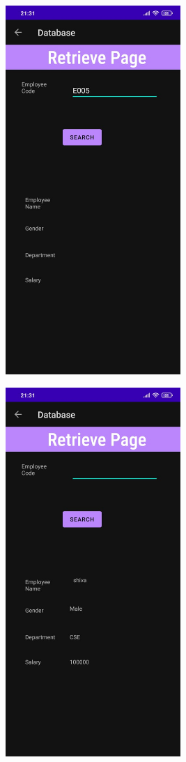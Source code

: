 \documentclass[12pt,letterpaper]{article}
\begin{document}
\newpage
\subsubsection*{}
\begin{figure}[h]
    \centering
    \includegraphics[height=14cm, keepaspectratio]{Outputs/OP11.jpeg}
\end{figure}
\begin{figure}
    \centering
    \includegraphics[height=14cm, keepaspectratio]{Outputs/OP12.jpeg}
\end{figure}
\end{document}
